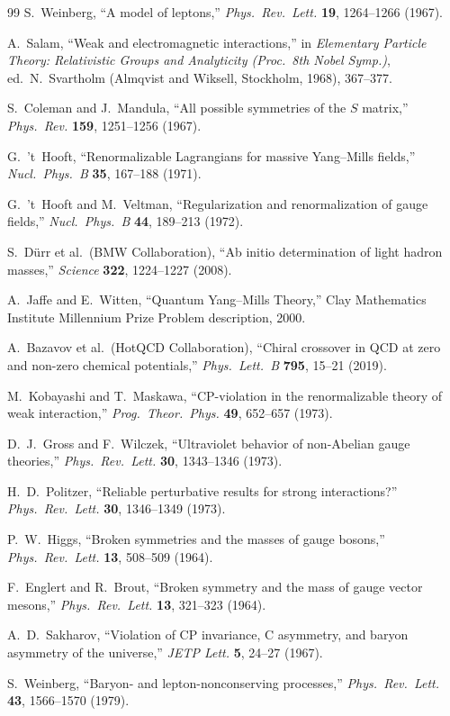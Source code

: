 \documentclass[12pt]{article}
\theoremstyle{definition}
\theoremstyle{remark}
\begin{document}
\begin{thebibliography}{99}
S.\ Weinberg, ``A model of leptons,'' \textit{Phys.\ Rev.\ Lett.} \textbf{19}, 1264--1266 (1967).

A.\ Salam, ``Weak and electromagnetic interactions,'' in \textit{Elementary Particle Theory: Relativistic Groups and Analyticity (Proc.\ 8th Nobel Symp.)}, ed.\ N.\ Svartholm (Almqvist and Wiksell, Stockholm, 1968), 367--377.

S.\ Coleman and J.\ Mandula, ``All possible symmetries of the $S$ matrix,'' \textit{Phys.\ Rev.} \textbf{159}, 1251--1256 (1967).

G.\ 't~Hooft, ``Renormalizable Lagrangians for massive Yang--Mills fields,'' \textit{Nucl.\ Phys.\ B} \textbf{35}, 167--188 (1971).

G.\ 't~Hooft and M.\ Veltman, ``Regularization and renormalization of gauge fields,'' \textit{Nucl.\ Phys.\ B} \textbf{44}, 189--213 (1972).

S.\ D\"urr et al.\ (BMW Collaboration), ``Ab initio determination of light hadron masses,'' \textit{Science} \textbf{322}, 1224--1227 (2008).

A.\ Jaffe and E.\ Witten, ``Quantum Yang--Mills Theory,'' Clay Mathematics Institute Millennium Prize Problem description, 2000.

A.\ Bazavov et al.\ (HotQCD Collaboration), ``Chiral crossover in QCD at zero and non-zero chemical potentials,'' \textit{Phys.\ Lett.\ B} \textbf{795}, 15--21 (2019).

M.\ Kobayashi and T.\ Maskawa, ``CP-violation in the renormalizable theory of weak interaction,'' \textit{Prog.\ Theor.\ Phys.} \textbf{49}, 652--657 (1973).

D.\ J.\ Gross and F.\ Wilczek, ``Ultraviolet behavior of non-Abelian gauge theories,'' \textit{Phys.\ Rev.\ Lett.} \textbf{30}, 1343--1346 (1973).

H.\ D.\ Politzer, ``Reliable perturbative results for strong interactions?'' \textit{Phys.\ Rev.\ Lett.} \textbf{30}, 1346--1349 (1973).

P.\ W.\ Higgs, ``Broken symmetries and the masses of gauge bosons,'' \textit{Phys.\ Rev.\ Lett.} \textbf{13}, 508--509 (1964).

F.\ Englert and R.\ Brout, ``Broken symmetry and the mass of gauge vector mesons,'' \textit{Phys.\ Rev.\ Lett.} \textbf{13}, 321--323 (1964).

A.\ D.\ Sakharov, ``Violation of CP invariance, C asymmetry, and baryon asymmetry of the universe,'' \textit{JETP Lett.} \textbf{5}, 24--27 (1967).

S.\ Weinberg, ``Baryon- and lepton-nonconserving processes,'' \textit{Phys.\ Rev.\ Lett.} \textbf{43}, 1566--1570 (1979).

\end{thebibliography}
\end{document}
